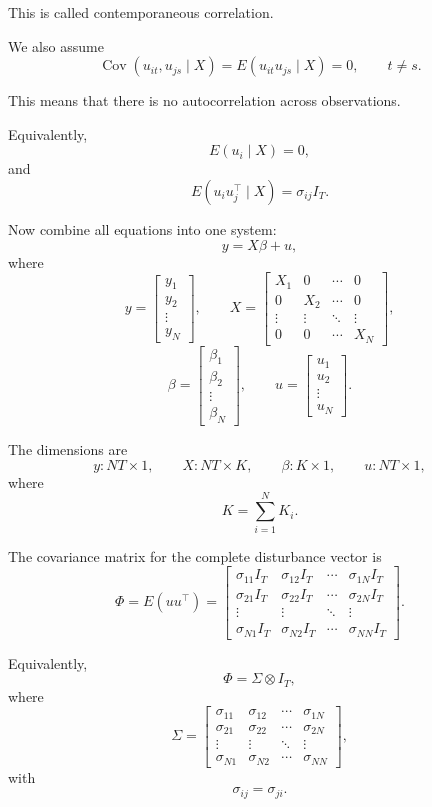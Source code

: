 This is called contemporaneous correlation.

We also assume
\[
\operatorname{Cov}(u_{it},u_{js}\mid X)
=
E(u_{it}u_{js}\mid X)
=
0,
\qquad
t\ne s.
\]

This means that there is no autocorrelation across observations.

Equivalently,
\[
E(u_i\mid X)=0,
\]
and
\[
E(u_iu_j^\top\mid X)=\sigma_{ij}I_T.
\]

Now combine all equations into one system:
\[
y=X\beta+u,
\]
where
\[
y=
\begin{bmatrix}
y_1\\
y_2\\
\vdots\\
y_N
\end{bmatrix},
\qquad
X=
\begin{bmatrix}
X_1 & 0 & \cdots & 0\\
0 & X_2 & \cdots & 0\\
\vdots & \vdots & \ddots & \vdots\\
0 & 0 & \cdots & X_N
\end{bmatrix},
\]
\[
\beta=
\begin{bmatrix}
\beta_1\\
\beta_2\\
\vdots\\
\beta_N
\end{bmatrix},
\qquad
u=
\begin{bmatrix}
u_1\\
u_2\\
\vdots\\
u_N
\end{bmatrix}.
\]

The dimensions are
\[
y:NT\times 1,
\qquad
X:NT\times K,
\qquad
\beta:K\times 1,
\qquad
u:NT\times 1,
\]
where
\[
K=\sum_{i=1}^N K_i.
\]

The covariance matrix for the complete disturbance vector is
\[
\Phi
=
E(uu^\top)
=
\begin{bmatrix}
\sigma_{11}I_T & \sigma_{12}I_T & \cdots & \sigma_{1N}I_T\\
\sigma_{21}I_T & \sigma_{22}I_T & \cdots & \sigma_{2N}I_T\\
\vdots & \vdots & \ddots & \vdots\\
\sigma_{N1}I_T & \sigma_{N2}I_T & \cdots & \sigma_{NN}I_T
\end{bmatrix}.
\]

Equivalently,
\[
\Phi
=
\Sigma\otimes I_T,
\]
where
\[
\Sigma
=
\begin{bmatrix}
\sigma_{11} & \sigma_{12} & \cdots & \sigma_{1N}\\
\sigma_{21} & \sigma_{22} & \cdots & \sigma_{2N}\\
\vdots & \vdots & \ddots & \vdots\\
\sigma_{N1} & \sigma_{N2} & \cdots & \sigma_{NN}
\end{bmatrix},
\]
with
\[
\sigma_{ij}=\sigma_{ji}.
\]

